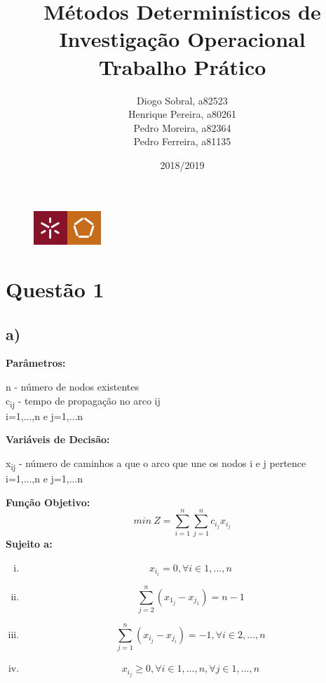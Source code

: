 \documentclass[11pt]{article} %
\title{Métodos Determinísticos de Investigação Operacional \\ \large Trabalho Prático}
\author{Diogo Sobral, a82523 \\ Henrique Pereira, a80261 \\ Pedro Moreira, a82364 \\ Pedro Ferreira, a81135}
\date{2018/2019}
\begin{document}
\maketitle

\begin{figure}[!b]
    \centering
    \includegraphics[width=1in]{um_eeng.jpg}
\end{figure}

\newpage

\section*{Questão 1}
\subsection*{a)}
\textbf{Parâmetros:}  \\
\begin{center}
n - número de nodos existentes \\
c\textsubscript{ij} - tempo de propagação no arco ij\\
i=1,...,n e j=1,...n \\
\end{center}
\textbf{Variáveis de Decisão:} \\
\begin{center}
x\textsubscript{ij} - número de caminhos a que o arco que une os nodos i e j pertence\\
i=1,...,n e j=1,...n \\
\end{center}
\textbf{Função Objetivo:} \\
$$min \ Z = \sum_{i=1}^{n} \sum_{j=1}^{n} c_i_jx_i_j$$
\textbf{Sujeito a:}
\begin{enumerate}[(i)]
\item $$x_i_i = 0, \forall i \in 1,...,n$$
\item $$\sum_{j=2}^{n} (x_1_j - x_j_1) = n-1$$
\item $$\sum_{j=1}^{n} (x_i_j - x_j_i) = -1, \forall i \in 2,...,n $$
\item $$x_i_j \geq 0, \forall i \in 1,...,n , \forall j \in 1,...,n$$
\end{enumerate}\\
\end{document}
